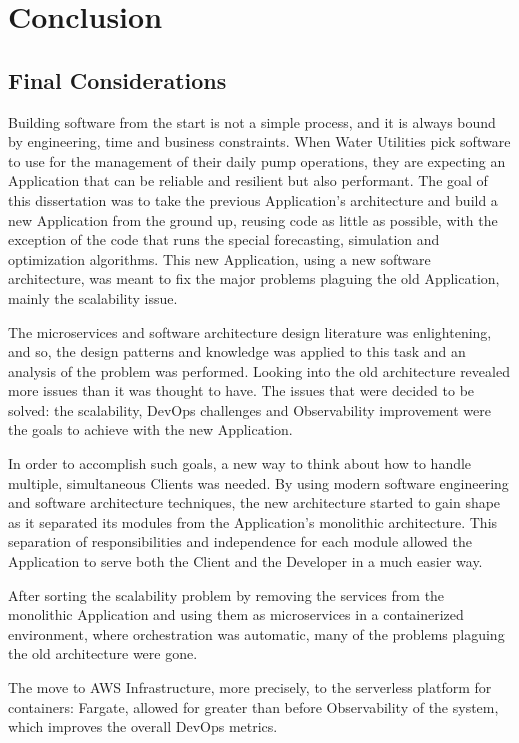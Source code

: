 \chapter{Conclusion}\label{conclusion}

\section{Final Considerations}\label{conclusion:s:final-considerations}

Building software from the start is not a simple process, and it is always bound by engineering, time and business constraints. When Water Utilities pick software to use for the management of their daily pump operations, they are expecting an Application that can be reliable and resilient but also performant. 
The goal of this dissertation was to take the previous Application's architecture and build a new Application from the ground up, reusing code as little as possible, with the exception of the code that runs the special forecasting, simulation and optimization algorithms. This new Application, using a new software architecture, was meant to fix the major problems plaguing the old Application, mainly the scalability issue.

The microservices and software architecture design literature was enlightening, and so, the design patterns and knowledge was applied to this task and an analysis of the problem was performed.
Looking into the old architecture revealed more issues than it was thought to have. The issues that were decided to be solved: the scalability, DevOps challenges and Observability improvement were the goals to achieve with the new Application.

In order to accomplish such goals, a new way to think about how to handle multiple, simultaneous Clients was needed. By using modern software engineering and software architecture techniques, the new architecture started to gain shape as it separated its modules from the Application's monolithic architecture. This separation of responsibilities and independence for each module allowed the Application to serve both the Client and the Developer in a much easier way.

After sorting the scalability problem by removing the services from the monolithic Application and using them as microservices in a containerized environment, where orchestration was automatic, many of the problems plaguing the old architecture were gone.

The move to AWS Infrastructure, more precisely, to the serverless platform for containers: Fargate, allowed for greater than before Observability of the system, which improves the overall DevOps metrics.

